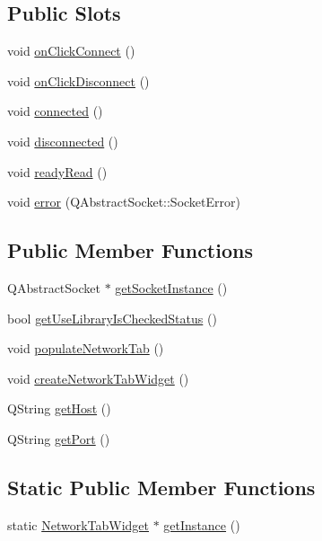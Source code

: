 \subsection*{Public Slots}
\begin{DoxyCompactItemize}
\item 
void \hyperlink{class_network_tab_widget_a852eff05d0a613eb7b8fc0e0bfdd0736}{on\+Click\+Connect} ()
\item 
void \hyperlink{class_network_tab_widget_a31b849f35ea3981762da5e7d5e951371}{on\+Click\+Disconnect} ()
\item 
void \hyperlink{class_network_tab_widget_ac9331d5677a53e58cef3c592e652c9cc}{connected} ()
\item 
void \hyperlink{class_network_tab_widget_a70744044832e441549355ff37cc9e47c}{disconnected} ()
\item 
void \hyperlink{class_network_tab_widget_ab1ce7580ab72e739357b7621788dd354}{ready\+Read} ()
\item 
void \hyperlink{class_network_tab_widget_ac1f26cd8a5af5253be312be5fc56c2ad}{error} (Q\+Abstract\+Socket\+::\+Socket\+Error)
\end{DoxyCompactItemize}
\subsection*{Public Member Functions}
\begin{DoxyCompactItemize}
\item 
Q\+Abstract\+Socket $\ast$ \hyperlink{class_network_tab_widget_ae12d4be4ad527d3b9fc0708b9dea6d3d}{get\+Socket\+Instance} ()
\item 
bool \hyperlink{class_network_tab_widget_a556f499076cd56a2090c007eb5f1e6be}{get\+Use\+Library\+Is\+Checked\+Status} ()
\item 
void \hyperlink{class_network_tab_widget_ae0bc81e20f98ac4cc7cd91da440e967f}{populate\+Network\+Tab} ()
\item 
void \hyperlink{class_network_tab_widget_aaaec9953ba986848054b308177d405cb}{create\+Network\+Tab\+Widget} ()
\item 
Q\+String \hyperlink{class_network_tab_widget_afa716a54017a9cde31278525107da66e}{get\+Host} ()
\item 
Q\+String \hyperlink{class_network_tab_widget_a6bca5b733737261fc4ee402324623e5b}{get\+Port} ()
\end{DoxyCompactItemize}
\subsection*{Static Public Member Functions}
\begin{DoxyCompactItemize}
\item 
static \hyperlink{class_network_tab_widget}{Network\+Tab\+Widget} $\ast$ \hyperlink{class_network_tab_widget_a350dbedf09f3c1fb5bbcba75cc282eb8}{get\+Instance} ()
\end{DoxyCompactItemize}
